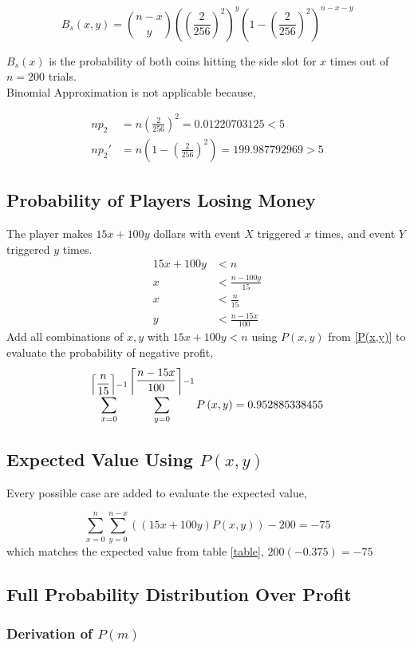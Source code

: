 \documentclass{article}
\begin{document}
\[B_s(x,y)={n-x\choose y}\left(\left(\dfrac{2}{256}\right)^{2}\right)^y\left(1-\left(\dfrac{2}{256}\right)^2\right)^{n-x-y}\]

$B_s(x)$ is the probability of both coins hitting the side slot for $x$ times out of $n=200$ trials.\\
Binomial Approximation is not applicable because,

\begin{align*}
np_2&=n\left(\frac{2}{256}\right)^{2}=0.01220703125<5\\np_2'&=n\left(1-\left(\frac{2}{256}\right)^{2}\right)=199.987792969>5
\end{align*}




\subsection{Probability of Players Losing Money}

The player makes $15x+100y$ dollars with event $X$ triggered $x$ times, and event $Y$ triggered $y$ times.
\begin{align*}
    15x+100y&<n\\
    x&<\frac{n-100y}{15}\\
    x&<\frac{n}{15}\tag{Maximizing $x$}\\
    y&<\frac{n-15x}{100}
\end{align*}
Add all combinations of $x,y$ with $15x+100y<n$ using $P(x,y)$ from \ref{P(x,y)} to evaluate the probability of negative profit,
\[\sum_{x=0}^{\left\lceil \dfrac{n}{15} \right\rceil-1} 
 \sum_{y=0}^{\left\lceil \dfrac{n-15x}{100} \right\rceil-1}P\left(x,y\right)=0.952885338455\label{negative m}\]


\subsection{Expected Value Using $P(x,y)$}
Every possible case are added to evaluate the expected value,

\[
    \sum_{x=0}^{n}\sum_{y=0}^{n-x}\left(\left(15x+100y\right)P\left(x,y\right)\right)-200=-75
\]
which matches the expected value from table \ref{table}, $200(-0.375)=-75$

\subsection{Full Probability Distribution Over Profit}
\subsubsection{Derivation of $P(m)$}
\end{document}
